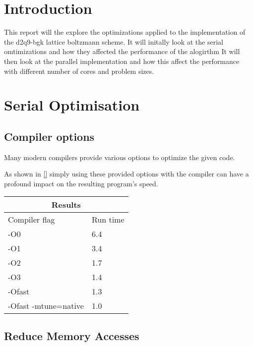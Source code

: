 \documentclass{article}
\begin{document}
\begin{multicols}{2}

\section{Introduction}

This report will the explore the optimizations applied to the implementation of
the d2q9-bgk lattice boltzmann scheme. It will initally look at the serial
omtimizations and how they affected the performance of the alogirthm It will
then look at the parallel implementation and how this affect the performance
with different number of cores and problem sizes.

\section{Serial Optimisation}

\subsection{Compiler options}

Many modern compilers provide various options to optimize the given code. 

As shown in \autoref{} simply using these provided options with the compiler
can have a profound impact on the resulting program's speed. 

\begin{center}
  \begin{tabular}{ |p{5cm}||p{1.5cm}| }
 \hline
 \multicolumn{2}{|c|}{Results} \\
 \hline
 Compiler flag & Run time \\
 \hline
 -O0                  & 6.4   \\
 -O1                  & 3.4   \\
 -O2                  & 1.7   \\ 
 -O3                  & 1.4   \\ 
 -Ofast               & 1.3   \\ 
 -Ofast -mtune=native & 1.0   \\
 \hline
\end{tabular}
\label{tab:parallelresults}
\end{center}

\subsection{Reduce Memory Accesses}


\end{multicols}
\end{document}
